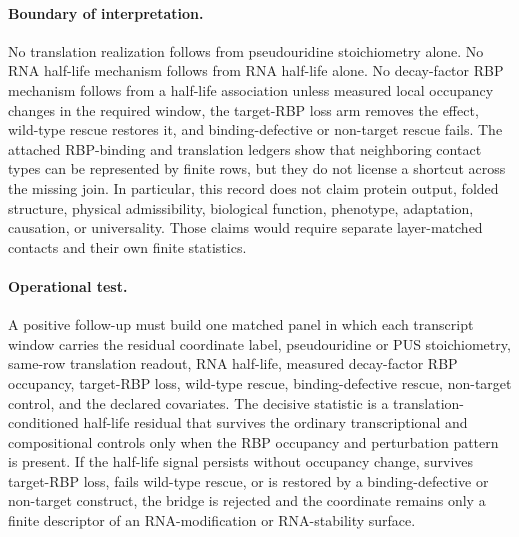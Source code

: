 \paragraph{Boundary of interpretation.}
No translation realization follows from pseudouridine stoichiometry alone.  No RNA half-life mechanism follows from RNA half-life alone.  No decay-factor RBP mechanism follows from a half-life association unless measured local occupancy changes in the required window, the target-RBP loss arm removes the effect, wild-type rescue restores it, and binding-defective or non-target rescue fails.  The attached RBP-binding and translation ledgers show that neighboring contact types can be represented by finite rows, but they do not license a shortcut across the missing join.  In particular, this record does not claim protein output, folded structure, physical admissibility, biological function, phenotype, adaptation, causation, or universality.  Those claims would require separate layer-matched contacts and their own finite statistics.

\paragraph{Operational test.}
A positive follow-up must build one matched panel in which each transcript window carries the residual coordinate label, pseudouridine or PUS stoichiometry, same-row translation readout, RNA half-life, measured decay-factor RBP occupancy, target-RBP loss, wild-type rescue, binding-defective rescue, non-target control, and the declared covariates.  The decisive statistic is a translation-conditioned half-life residual that survives the ordinary transcriptional and compositional controls only when the RBP occupancy and perturbation pattern is present.  If the half-life signal persists without occupancy change, survives target-RBP loss, fails wild-type rescue, or is restored by a binding-defective or non-target construct, the bridge is rejected and the coordinate remains only a finite descriptor of an RNA-modification or RNA-stability surface.